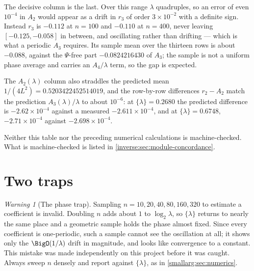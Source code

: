 \documentclass[11pt,oneside]{article}
\theoremstyle{definition}
\theoremstyle{remark}
\newtheorem{warning}[warning]{Warning}
\begin{document}
The decisive column is the last.  Over this range $\lambda$ quadruples, so
an error of even $10^{-4}$ in $A_2$ would appear as a drift in $r_3$ of
order $3\times10^{-2}$ with a definite sign.  Instead $r_3$ is $-0.112$ at
$n=100$ and $-0.110$ at $n=400$, never leaving $[-0.125,-0.058]$ in
between, and oscillating rather than drifting --- which is what a periodic
$A_3$ requires.  Its sample mean over the thirteen rows is about $-0.088$,
against the $\Psi$-free part $-0.0824216430$ of $A_3$; the sample is not a
uniform phase average and carries an $A_4/\lambda$ term, so the gap is
expected.

The $A_2(\lambda)$ column also straddles the predicted mean
$1/(4L^2)=0.5203422452514019$, and the row-by-row differences
$r_2-A_2$ match the prediction $A_3(\lambda)/\lambda$ to about $10^{-6}$:
at $\{\lambda\}=0.2680$ the predicted difference is $-2.62\times10^{-4}$
against a measured $-2.611\times10^{-4}$, and at $\{\lambda\}=0.6748$,
$-2.71\times10^{-4}$ against $-2.698\times10^{-4}$.

Neither this table nor the preceding numerical calculations is machine-checked.  What is
machine-checked is listed in \cref{inverse:sec:module-concordance}.

\section{Two traps}\label{smallarg:sec:traps}

\begin{warning}[The phase trap]
Sampling $n=10,20,40,80,160,320$ to estimate a coefficient is invalid.  Doubling
$n$ adds about $1$ to $\log_2\lambda$, so $\{\lambda\}$ returns to nearly the
same place and a geometric sample holds the phase almost fixed.  Since every
coefficient is one-periodic, such a sample cannot see the oscillation at all;
it shows only the $\BigO(1/\lambda)$ drift in magnitude, and looks like
convergence to a constant.  This mistake was made independently on this project
before it was caught.  Always sweep $n$ densely and report against
$\{\lambda\}$, as in \cref{smallarg:sec:numerics}.
\end{warning}
\end{document}

